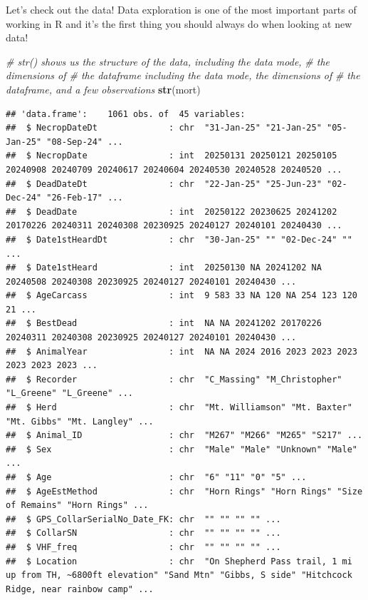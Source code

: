 \documentclass[
]{book}
\newenvironment{Shaded}{\begin{snugshade}}{\end{snugshade}}
\newcommand{\CommentTok}[1]{\textcolor[rgb]{0.56,0.35,0.01}{\textit{#1}}}
\newcommand{\FunctionTok}[1]{\textcolor[rgb]{0.13,0.29,0.53}{\textbf{#1}}}
\newcommand{\NormalTok}[1]{#1}
\begin{document}
Let's check out the data! Data exploration is one of the most important parts of working in R and it's the first thing you should always do when looking at new data!

\begin{Shaded}
\begin{Highlighting}[]
\CommentTok{\# str() shows us the structure of the data, including the data mode, }
\CommentTok{\# the dimensions of \# the dataframe including the data mode, the dimensions of }
\CommentTok{\# the dataframe, and a few observations}
\FunctionTok{str}\NormalTok{(mort)  }
\end{Highlighting}
\end{Shaded}

\begin{verbatim}
## 'data.frame':    1061 obs. of  45 variables:
##  $ NecropDateDt              : chr  "31-Jan-25" "21-Jan-25" "05-Jan-25" "08-Sep-24" ...
##  $ NecropDate                : int  20250131 20250121 20250105 20240908 20240709 20240617 20240604 20240530 20240528 20240520 ...
##  $ DeadDateDt                : chr  "22-Jan-25" "25-Jun-23" "02-Dec-24" "26-Feb-17" ...
##  $ DeadDate                  : int  20250122 20230625 20241202 20170226 20240311 20240308 20230925 20240127 20240101 20240430 ...
##  $ Date1stHeardDt            : chr  "30-Jan-25" "" "02-Dec-24" "" ...
##  $ Date1stHeard              : int  20250130 NA 20241202 NA 20240508 20240308 20230925 20240127 20240101 20240430 ...
##  $ AgeCarcass                : int  9 583 33 NA 120 NA 254 123 120 21 ...
##  $ BestDead                  : int  NA NA 20241202 20170226 20240311 20240308 20230925 20240127 20240101 20240430 ...
##  $ AnimalYear                : int  NA NA 2024 2016 2023 2023 2023 2023 2023 2023 ...
##  $ Recorder                  : chr  "C_Massing" "M_Christopher" "L_Greene" "L_Greene" ...
##  $ Herd                      : chr  "Mt. Williamson" "Mt. Baxter" "Mt. Gibbs" "Mt. Langley" ...
##  $ Animal_ID                 : chr  "M267" "M266" "M265" "S217" ...
##  $ Sex                       : chr  "Male" "Male" "Unknown" "Male" ...
##  $ Age                       : chr  "6" "11" "0" "5" ...
##  $ AgeEstMethod              : chr  "Horn Rings" "Horn Rings" "Size of Remains" "Horn Rings" ...
##  $ GPS_CollarSerialNo_Date_FK: chr  "" "" "" "" ...
##  $ CollarSN                  : chr  "" "" "" "" ...
##  $ VHF_freq                  : chr  "" "" "" "" ...
##  $ Location                  : chr  "On Shepherd Pass trail, 1 mi up from TH, ~6800ft elevation" "Sand Mtn" "Gibbs, S side" "Hitchcock Ridge, near rainbow camp" ...

\end{verbatim}
\end{document}
